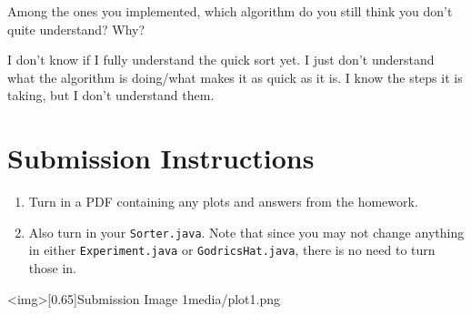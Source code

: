 \documentclass{homework}
\begin{document}
\question Among the ones you implemented, which algorithm do you still think
you don't quite understand? Why?

\begin{sol}
  I don't know if I fully understand the quick sort yet. I just don't understand what the algorithm is doing/what makes it as quick as it is. 
  I know the steps it is taking, but I don't understand them.
\end{sol}

\section*{Submission Instructions}

\begin{enumerate}
  \item Turn in a PDF containing any plots and answers from the homework.
  \item Also turn in your \texttt{Sorter.java}. Note that since you may
        not change anything in either \texttt{Experiment.java} or
        \texttt{GodricsHat.java}, there is no need to turn those in.
\end{enumerate}

\img<img>[0.65]{Submission Image 1}{media/plot1.png}
\end{document}
